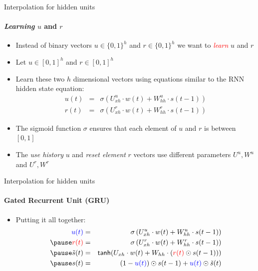 \begin{frame}{Interpolation for hidden units}
\framesubtitle{{\it Learning} $u$ and $r$}
\begin{itemize}[<+->]
	\item Instead of binary vectors $u \in \{0,1\}^h$ and $r \in \{0,1\}^h$ we want to \textcolor{red}{{\em learn}} $u$ and $r$
	\item Let $u \in [0,1]^h$ and $r \in [0,1]^h$
	\item Learn these two $h$ dimensional vectors using equations similar to the RNN hidden state equation:
	\begin{eqnarray*}
		u(t) &=& \sigma\left( U^u_{xh} \cdot w(t) + W^u_{hh} \cdot s(t-1) \right)  \\
		r(t) &=& \sigma\left( U^r_{xh} \cdot w(t) + W^r_{hh} \cdot s(t-1) \right)
	\end{eqnarray*}
	\item The sigmoid function $\sigma$ ensures that each element of $u$ and $r$ is between $[0,1]$
	\item The {\it use history} $u$ and {\it reset element} $r$ vectors use different parameters $U^u, W^u$ and $U^r, W^r$
\end{itemize}
\end{frame}

\begin{frame}{Interpolation for hidden units}
\framesubtitle{Gated Recurrent Unit (GRU)}
\begin{itemize}[<+->]
	\item Putting it all together:
	\begin{eqnarray*}
		\textcolor{blue}{u(t)} &=& \sigma\left( U^u_{xh} \cdot w(t) + W^u_{hh} \cdot s(t-1) \right)  \\ \pause 
		\textcolor{red}{r(t)} &=& \sigma\left( U^r_{xh} \cdot w(t) + W^r_{hh} \cdot s(t-1) \right) \\ \pause 
		\tilde{s}(t) &=& \textsf{tanh}(U_{xh} \cdot w(t) + W_{hh} \cdot \left( \textcolor{red}{r(t)} \odot s(t-1) \right) ) \\ \pause 
		s(t) &=& (1-\textcolor{blue}{u(t)}) \odot s(t-1) + \textcolor{blue}{u(t)} \odot \tilde{s}(t) 
	\end{eqnarray*}
\end{itemize}
\end{frame}

